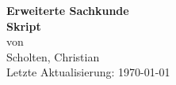 \begin{titlepage}
\begin{center}
\huge{\textbf{Erweiterte Sachkunde}}\\
\vspace*{2em}
\LARGE{\textbf{Skript}}\\
\vspace*{2em}
\normalsize
\vspace*{2em}
von\\
\vspace*{2em}
\Large{Scholten, Christian}\\
\vspace*{3em}
\vspace*{1em}
\vfill
Letzte Aktualisierung: \today
\end{center}
\end{titlepage}
